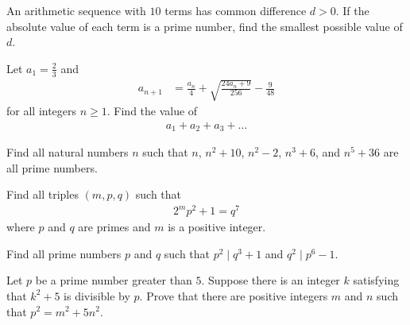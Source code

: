 \documentclass[problems.tex]{subfile}
\begin{document}
	\begin{problem}
		An arithmetic sequence with $10$ terms has common difference $d > 0$. If the absolute value of each term is a prime number, find the smallest possible value of $d$.
	\end{problem}

	\begin{problem}
		Let $a_1 = \frac{2}{3}$ and
		\begin{align*}
			a_{n+1} &= \frac{a_n}{4} + \sqrt{\frac{24a_n+9}{256}} - \frac{9}{48}
		\end{align*}
		for all integers $n \geq 1$. Find the value of
		\begin{align*}
			a_1+a_2+a_3+\dots
		\end{align*}
	\end{problem}

	\begin{problem}
		Find all natural numbers $n$ such that $n$, $n^2+10$, $n^2-2$, $n^3+6$, and $n^5+36$ are all prime numbers. %
	\end{problem}

	\begin{problem}
		Find all triples $(m,p,q)$ such that
		\begin{align*}
			2^mp^2 +1=q^7
		\end{align*}
		where $p$ and $q$ are primes and $m$ is a positive integer. %
	\end{problem}

	\begin{problem}
		Find all prime numbers $p$ and $q$ such that $p^2\mid q^3+1$ and $q^2\mid p^6-1$. %
	\end{problem}

	\begin{problem}
		Let $p$ be a prime number greater than $5$. Suppose there is an integer $k$ satisfying that $k^2+5$ is divisible by $p$. Prove that there are positive integers $m$ and $n$ such that $p^2=m^2+5n^2$. %
	\end{problem}
\end{document}
